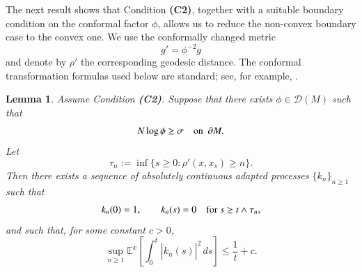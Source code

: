\documentclass[11pt,twoside, reqno]{article}
\newcommand\1{\mathbbm{1}}
\newtheorem{lemma}[theorem]{Lemma}
\theoremstyle{definition}
\numberwithin{equation}{section}
\begin{document}
The next result shows that Condition {\bf(C2)}, together with a suitable
boundary condition on the conformal factor \(\phi\), allows us to reduce the
non-convex boundary case to the convex one. We use the conformally changed
metric
\[
        g'=\phi^{-2}g
\]
and denote by \(\rho'\) the corresponding geodesic distance. The conformal
transformation formulas used below are standard; see, for example,
\cite[Section~3.2]{Wbook14}.

\begin{lemma}\label{lem3-1}
Assume Condition {\bf(C2)}. Suppose that there exists
\(\phi\in\mathcal D(M)\) such that
\[
        N\log\phi\geq \sigma
        \quad \hbox{on }\ \partial M .
\]
Let
\[
        \tau_n:=\inf\{s\geq0:\rho'(x,x_s)\geq n\}.
\]
Then there exists a sequence of absolutely continuous adapted processes
\(\{k_n\}_{n\geq1}\) such that
\[
        k_n(0)=1,
        \qquad
        k_n(s)=0 \quad \hbox{for } s\geq t\wedge\tau_n,
\]
and such that, for some constant \(c>0\),
\[
        \sup_{n\geq1}
        \mathbb E^x\left[\int_0^t |\dot k_n(s)|^2\,ds\right]
        \leq
        \frac1t+c.
\]
\end{lemma}
\end{document}
